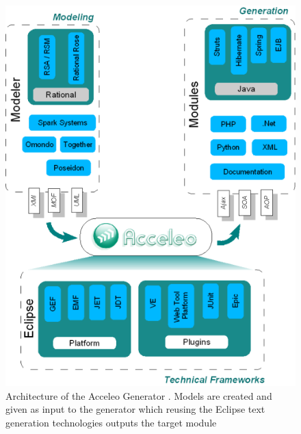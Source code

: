\begin{figure}
  \begin{center}
    \includegraphics[scale=0.6]{pictures/acceleo-archi-en.png}
    \caption{Architecture of the Acceleo Generator \cite{AcceleoArchitectureWeb}. Models are created and given as input to the generator which reusing the Eclipse text generation technologies outputs the target module}
    \label{fig:AcceleoArchitecture}
  \end{center}
\end{figure}





